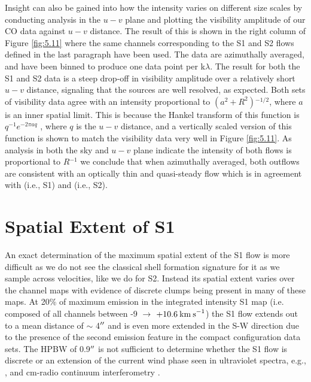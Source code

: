 Insight can also be gained into how the intensity varies on different size scales by conducting analysis in the $u-v$ plane and plotting the visibility amplitude of our CO data against $u-v$ distance. The result of this is shown in the right column of Figure \ref{fig:5.11} where the same channels corresponding to the S1 and S2 flows defined in the last paragraph have been used. The data are azimuthally averaged, and have been binned to produce one data point per k$\lambda$. The result for both the S1 and S2 data is a steep drop-off in visibility amplitude over a relatively short $u-v$ distance, signaling that the sources are well resolved, as expected. Both sets of visibility data agree with an intensity proportional to $(a^2 + R^2){}^{-1/2}$, where $a$ is an inner spatial limit. This is because the Hankel transform of this function is $q^{-1}e^{-2\pi aq}$ \citep{bracewell_2000}, where $q$ is the $u-v$ distance, and a vertically scaled version of this function is shown to match the visibility data very well in Figure \ref{fig:5.11}. As analysis in both the sky and $u-v$ plane indicate the intensity of both flows is proportional to $R{}^{-1}$ we conclude that when azimuthally averaged, both outflows are  consistent with an optically thin and quasi-steady flow which is in agreement with \cite{smith_2009} (i.e., S1) and \cite{plez_2002} (i.e., S2). 

\section{Spatial Extent of S1}\label{sec:5.8}
An exact determination of the maximum spatial extent of the S1 flow is more difficult as we do not see the classical shell formation signature for it as we sample across velocities, like we do for S2. Instead its spatial extent varies over the channel maps with evidence of discrete clumps being present in many of these maps. At 20\% of maximum emission in the integrated intensity S1 map (i.e. composed of all channels between -9 $\rightarrow$ $+10.6\>{\rm km\>s}^{-1}$) the S1 flow extends out to a mean distance of $\sim$ 4$^{\prime\prime}$ and is even more extended in the S-W direction due to the presence of the second emission feature in the compact configuration data sets. The HPBW of 0.9$^{\prime\prime}$ is not sufficient to determine whether the S1 flow is discrete or an extension of the current wind phase seen in ultraviolet spectra, e.g., \cite{1997ApJ...479..970C}, and cm-radio continuum interferometry \citep{1998Natur.392..575L, harper_2001}.

